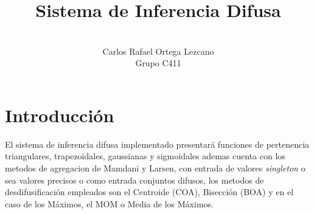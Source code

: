 \documentclass[a4paper,10pt,twocolumn]{article}
\title{Sistema de Inferencia Difusa}
\author{\\
	\name Carlos Rafael Ortega Lezcano \\ \addr Grupo C411 }
\begin{document}



\section*{Introducci\'on}\label{sec:intro}

El sistema de inferencia difusa implementado presentar\'a funciones de pertenencia triangulares, trapezoidales, gaussianas y sigmoidales ademas cuenta con los metodos de agregacion de Mamdani y Larsen, con entrada de valores \textit{singleton} o sea valores precisos o como entrada conjuntos difusos, los metodos de desdifusificaci\'on empleados son el Centroide (COA), Bisecci\'on (BOA) y en el caso de los M\'aximos, el MOM o Media de los M\'aximos.
\end{document}
